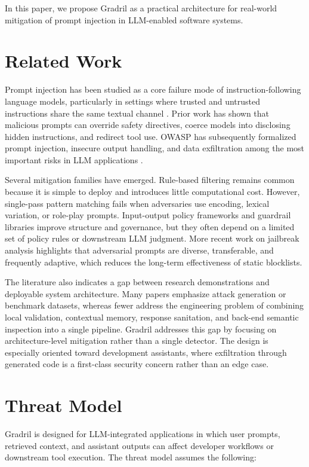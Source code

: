 \documentclass[journal]{IEEEtran}
\begin{document}
In this paper, we propose Gradril as a practical architecture for real-world mitigation of prompt injection in LLM-enabled software systems.

\section{Related Work}
Prompt injection has been studied as a core failure mode of instruction-following language models, particularly in settings where trusted and untrusted instructions share the same textual channel \cite{greshake2023more}. Prior work has shown that malicious prompts can override safety directives, coerce models into disclosing hidden instructions, and redirect tool use. OWASP has subsequently formalized prompt injection, insecure output handling, and data exfiltration among the most important risks in LLM applications \cite{owasp_llm_top10}.

Several mitigation families have emerged. Rule-based filtering remains common because it is simple to deploy and introduces little computational cost. However, single-pass pattern matching fails when adversaries use encoding, lexical variation, or role-play prompts. Input-output policy frameworks and guardrail libraries improve structure and governance, but they often depend on a limited set of policy rules or downstream LLM judgment. More recent work on jailbreak analysis highlights that adversarial prompts are diverse, transferable, and frequently adaptive, which reduces the long-term effectiveness of static blocklists.

The literature also indicates a gap between research demonstrations and deployable system architecture. Many papers emphasize attack generation or benchmark datasets, whereas fewer address the engineering problem of combining local validation, contextual memory, response sanitation, and back-end semantic inspection into a single pipeline. Gradril addresses this gap by focusing on architecture-level mitigation rather than a single detector. The design is especially oriented toward development assistants, where exfiltration through generated code is a first-class security concern rather than an edge case.

\section{Threat Model}
Gradril is designed for LLM-integrated applications in which user prompts, retrieved context, and assistant outputs can affect developer workflows or downstream tool execution. The threat model assumes the following:
\end{document}
